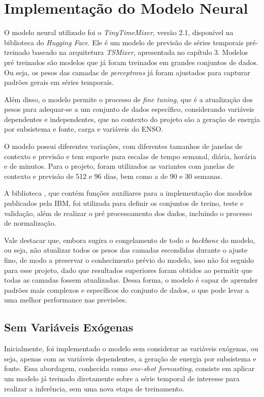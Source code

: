 \section{Implementação do Modelo Neural} %
O modelo neural utilizado foi o \textit{TinyTimeMixer}, versão 2.1, disponível na biblioteca  do 
\textit{Hugging Face}. Ele é um modelo de previsão de séries temporais pré-treinado baseado na arquitetura \textit{TSMixer}, 
apresentada no capítulo 3. Modelos pré treinados são modelos que já foram treinados em grandes conjuntos de dados. Ou seja, 
os pesos das camadas de \textit{perceptrons} já foram ajustados para capturar padrões gerais em séries temporais.

Além disso, o modelo permite o processo de \textit{fine tuning}, que é a atualização dos pesos para adequar-se
a um conjunto de dados específico, considerando variáveis dependentes e independentes, que no contexto do projeto são a geração de energia
por subsistema e fonte, carga e variáveis do ENSO.

O modelo possui diferentes variações, com diferentes tamanhos de janelas de contexto e previsão e tem suporte para escalas 
de tempo semanal, diária, horária e de minutos. Para o projeto, foram utilizados as variantes com janelas de contexto e 
previsão de 512 e 96 dias, bem como a de 90 e 30 semanas.

A biblioteca , que contém funções auxiliares para a implementação dos modelos publicados pela IBM, foi
utilizada para definir os conjuntos de treino, teste e validação, além de realizar o pré processamento dos dados, incluindo o
processo de normalização.

Vale destacar que, embora  sugira o congelamento de todo o \textit{backbone} do modelo, ou seja, 
não atualizar todos os pesos das camadas escondidas durante o ajuste fino, de modo a preservar o conhecimento prévio do modelo,
isso não foi seguido para esse projeto, dado que resultados superiores foram obtidos ao permitir que todas as camadas 
fossem atualizadas. Dessa forma, o modelo é capaz de aprender padrões mais complexos e específicos do conjunto de dados, 
o que pode levar a uma melhor performance nas previsões.

\subsection{Sem Variáveis Exógenas} %
Inicialmente, foi implementado o modelo sem considerar as variáveis exógenas, ou seja, apenas com as variáveis dependentes, a 
geração de energia por subsistema e fonte. Essa abordagem, conhecida como \textit{one-shot forecasting}, consiste em aplicar 
um modelo já treinado diretamente sobre a série temporal de interesse para realizar a inferência, sem uma nova etapa de treinamento.

